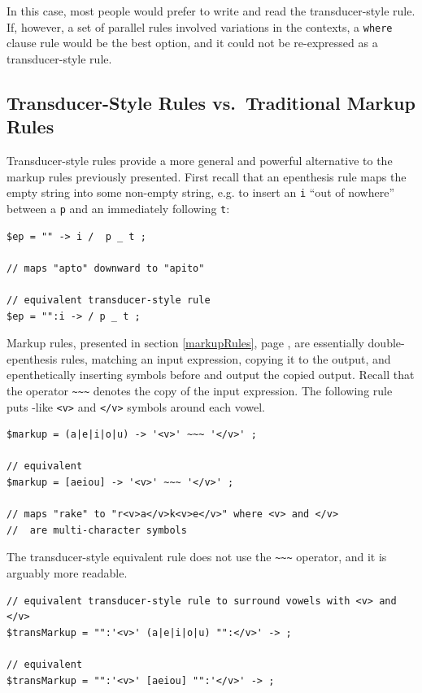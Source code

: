 \noindent
In this case, most people would prefer to write and read the transducer-style
rule.  If, however,
a set of parallel rules involved variations in the contexts, a 
\texttt{where} clause rule would be the 
best option, and it could not be re-expressed as a transducer-style rule.


\subsection{Transducer-Style Rules vs.\ Traditional Markup Rules}

Transducer-style rules provide a more general and powerful alternative to the markup rules
previously presented.  First
recall that an epenthesis rule maps the empty string into some non-empty string, e.g. to
insert an \verb!i! ``out of nowhere'' between a \verb!p! and an immediately following
\verb!t!:

\begin{Verbatim}
$ep = "" -> i /  p _ t ;

// maps "apto" downward to "apito"

// equivalent transducer-style rule
$ep = "":i -> / p _ t ;
\end{Verbatim}


Markup rules, presented in section \ref{markupRules}, page \pageref{markupRules}, are essentially double-epenthesis
rules, matching an input expression, copying it to the output, and epenthetically inserting
symbols before and output the copied output.  Recall that the operator \verb!~~~! denotes the
copy of the input expression.  The following rule puts -like \verb!<v>! and
\verb!</v>! symbols around each vowel.

\begin{Verbatim}
$markup = (a|e|i|o|u) -> '<v>' ~~~ '</v>' ;

// equivalent
$markup = [aeiou] -> '<v>' ~~~ '</v>' ;

// maps "rake" to "r<v>a</v>k<v>e</v>" where <v> and </v>
//	are multi-character symbols
\end{Verbatim}

The transducer-style equivalent rule does not use the \verb!~~~! operator, and it is arguably
more readable.

\begin{Verbatim}
// equivalent transducer-style rule to surround vowels with <v> and </v>
$transMarkup = "":'<v>' (a|e|i|o|u) "":</v>' -> ;

// equivalent
$transMarkup = "":'<v>' [aeiou] "":'</v>' -> ;
\end{Verbatim}

